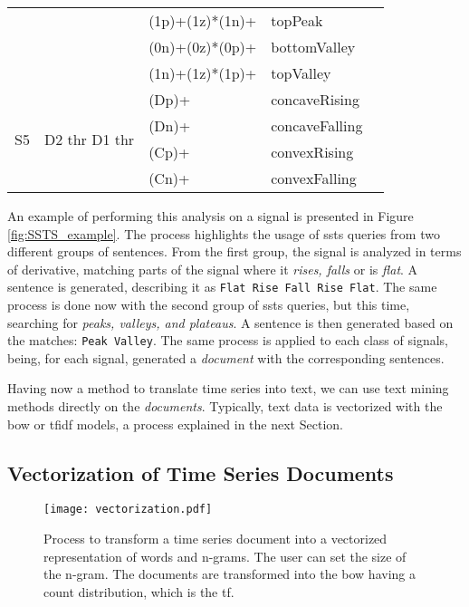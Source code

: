 \begin{table}
\begin{center}
\begin{tabularx}{\linewidth}{ XXXXX }
 & & (1p)+(1z)*(1n)+ & \textcolor{myblue2}{topPeak}\\
 & & (0n)+(0z)*(0p)+ & \textcolor{mypurple}{bottomValley}\\
 & & (1n)+(1z)*(1p)+ & \textcolor{myorange}{topValley}\\
 \hline
\multirow{4}{1em}{S5} & \multirow{4}{6em}{D2 thr D1 thr} & (Dp)+ & concaveRising\\
& & (Dn)+ & concaveFalling\\
& & (Cp)+ & convexRising\\
& &(Cn)+ & convexFalling\\
\bottomrule[1.5pt]
\end{tabularx}
\label{tab:ssts_queries}
\end{center}
\end{table}
 
An example of performing this analysis on a signal is presented in Figure \ref{fig:SSTS_example}. The process highlights the usage of \gls{ssts} queries from two different groups of sentences. From the first group, the signal is analyzed in terms of derivative, matching parts of the signal where it \textit{rises, falls} or is \textit{flat}. A sentence is generated, describing it as \texttt{Flat Rise Fall Rise Flat}. The same process is done now with the second group of \gls{ssts} queries, but this time, searching for \textit{peaks, valleys, and plateaus}. A sentence is then generated based on the matches: \texttt{Peak Valley}. The same process is applied to each class of signals, being, for each signal, generated a \textit{document} with the corresponding sentences.

Having now a method to translate time series into text, we can use text mining methods directly on the \textit{documents}. Typically, text data is vectorized with the \gls{bow} or \gls{tfidf} models, a process explained in the next Section.

\subsection{Vectorization of Time Series Documents}


\begin{figure}[!h]
    \centering
    \texttt{[image: vectorization.pdf]}
    \caption{Process to transform a time series document into a vectorized representation of words and n-grams. The user can set the size of the n-gram. The documents are transformed into the \gls{bow} having a count distribution, which is the \gls{tf}.}
    \label{fig:sentence_gen}
\end{figure}

